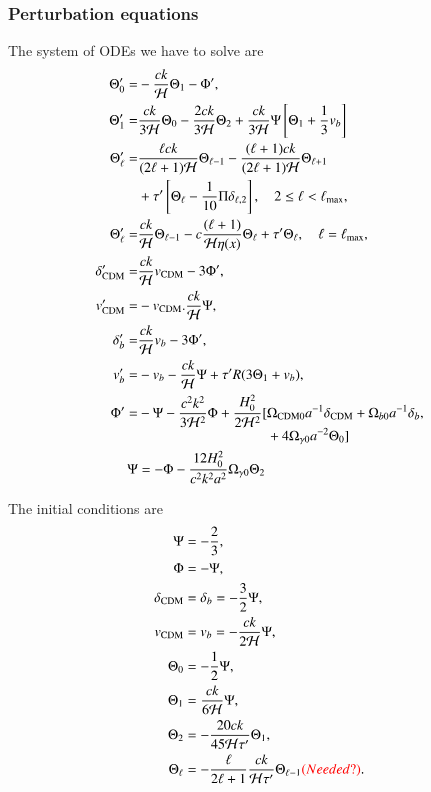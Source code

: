 \subsubsection{Perturbation equations}
The system of ODEs we have to solve are  
\begin{subequations}
    \begin{align}
        \Theta_0' =& - \frac{ck}{\mathcal{H}}\Theta_1 - \Phi', \\
        \Theta_1' =& \frac{ck}{3\mathcal{H}}\Theta_0 - \frac{2ck}{3\mathcal{H}}\Theta_2 + \frac{ck}{3\mathcal{H}}\Psi \left[ \Theta_1 + \frac{1}{3}v_b \right] \\ 
        \Theta_\ell' =& \frac{\ell ck}{(2\ell+1)\mathcal{H}}\Theta_{\ell-1} - \frac{(\ell+1)ck}{(2\ell+1)\mathcal{H}}\Theta_{\ell+1} \nonumber \\
        & + \tau'\left[ \Theta_\ell - \frac{1}{10}\Pi \delta_{\ell,2} \right],\quad 2\leq\ell<\ell_\mathrm{max}, \\
        \Theta_\ell' =& \frac{ck}{\mathcal{H}}\Theta_{\ell-1} - c \frac{(\ell+1)}{\mathcal{H}\eta(x)}\Theta_{\ell} + \tau' \Theta_\ell,\quad \ell=\ell_\mathrm{max}, \\
        \delta_\mathrm{CDM}' =& \frac{ck}{\mathcal{H}} v_\mathrm{CDM} - 3\Phi', \\
        v_\mathrm{CDM}' =& - v_\mathrm{CDM} . \frac{ck}{\mathcal{H}} \Psi, \\
        \delta_b' =& \frac{ck}{\mathcal{H}} v_b - 3\Phi', \\
        v_b' =& -v_b - \frac{ck}{\mathcal{H}} \Psi + \tau' R(3\Theta_1 + v_b), \\
        \Phi' =& -\Psi - \frac{c^2 k^2}{3\mathcal{H}^2}\Phi + \frac{H_0^2}{2\mathcal{H}^2} \begin{aligned}[t]
            [&\Omega_\mathrm{CDM0} a^{-1}\delta_\mathrm{CDM} + \Omega_{b0} a^{-1} \delta_b \\
            &+4\Omega_{\gamma 0} a^{-2} \Theta_0] 
            \end{aligned}, \\
        \Psi &= -\Phi - \frac{12H_0^2}{c^2 k^2 a^2} \Omega_{\gamma 0} \Theta_2
    \end{align}
\end{subequations}



The initial conditions are 
\begin{subequations}
    \begin{align}
        \Psi &= -\frac{2}{3}, \\
        \Phi &= - \Psi, \\
        \delta_\mathrm{CDM} &= \delta_b = -\frac{3}{2}\Psi, \\
        v_\mathrm{CDM} &= v_b = -\frac{ck}{2\mathcal{H}} \Psi, \\
        \Theta_0 &= -\frac{1}{2}\Psi, \\
        \Theta_1 &= \frac{ck}{6\mathcal{H}}\Psi, \\
        \Theta_2 &= - \frac{20ck}{45\mathcal{H}\tau'}\Theta_1, \\
        \Theta_\ell &= - \frac{\ell}{2\ell+1} \frac{ck}{\mathcal{H}\tau'}\Theta_{\ell-1} \textcolor{red}{(Needed?)}.
    \end{align}
\end{subequations}




